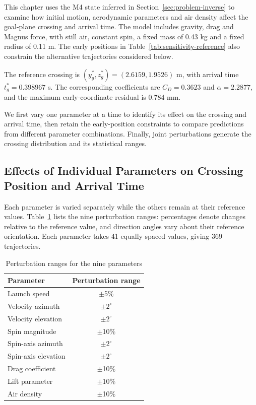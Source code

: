 \documentclass[12pt,letterpaper]{article}
\newcommand{\SensitivityReferenceY}{2.6159}
\newcommand{\SensitivityReferenceZ}{1.9526}
\newcommand{\SensitivityReferenceTime}{0.398967}
\begin{document}
\noindent\hspace*{\parindent}This chapter uses the M4 state inferred in Section~\ref{sec:problem-inverse} to examine how initial motion, aerodynamic parameters and air density affect the goal-plane crossing and arrival time. The model includes gravity, drag and Magnus force, with still air, constant spin, a fixed mass of 0.43 kg and a fixed radius of 0.11 m. The early positions in Table~\ref{tab:sensitivity-reference} also constrain the alternative trajectories considered below.

The reference crossing is $(y_g^*,z_g^*)=(\SensitivityReferenceY,\SensitivityReferenceZ)$ m, with arrival time $t_g^*=\SensitivityReferenceTime$ s. The corresponding coefficients are $C_D=0.3623$ and $\alpha=2.2877$, and the maximum early-coordinate residual is 0.784 mm.

We first vary one parameter at a time to identify its effect on the crossing and arrival time, then retain the early-position constraints to compare predictions from different parameter combinations. Finally, joint perturbations generate the crossing distribution and its statistical ranges.

\FloatBarrier
\subsection{Effects of Individual Parameters on Crossing Position and Arrival Time}\label{sec:sensitivity-local}

\noindent\hspace*{\parindent}Each parameter is varied separately while the others remain at their reference values. Table~\ref{tab:sensitivity-scan-ranges} lists the nine perturbation ranges: percentages denote changes relative to the reference value, and direction angles vary about their reference orientation. Each parameter takes 41 equally spaced values, giving 369 trajectories.

\begin{table}[H]\centering\small
\renewcommand{\arraystretch}{1.15}
\caption{Perturbation ranges for the nine parameters}
\begin{tabular}{lc}\toprule
Parameter & Perturbation range\\\midrule
Launch speed & $\pm$5\%\\
Velocity azimuth & $\pm$$2^\circ$\\
Velocity elevation & $\pm$$2^\circ$\\
Spin magnitude & $\pm$10\%\\
Spin-axis azimuth & $\pm$$2^\circ$\\
Spin-axis elevation & $\pm$$2^\circ$\\
Drag coefficient & $\pm$10\%\\
Lift parameter & $\pm$10\%\\
Air density & $\pm$10\%\\
\bottomrule\end{tabular}\label{tab:sensitivity-scan-ranges}
\end{table}
\end{document}
